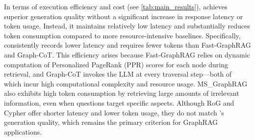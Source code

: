 In terms of execution efficiency and cost (see \autoref{tab:main_results}), \name{} achieves superior generation quality without a significant increase in response latency or token usage. Instead, it maintains relatively low latency and substantially reduces token consumption compared to more resource‐intensive baselines. Specifically, \name{} consistently records lower latency and requires fewer tokens than Fast-GraphRAG and Graph-CoT. This efficiency arises because Fast-GraphRAG relies on dynamic computation of Personalized PageRank (PPR) scores for each node during retrieval, and Graph-CoT invokes the LLM at every traversal step—both of which incur high computational complexity and resource usage. MS\_GraphRAG also exhibits high token consumption by retrieving large amounts of irrelevant information, even when questions target specific aspects. Although RoG and Cypher offer shorter latency and lower token usage, they do not match \name{}’s generation quality, which remains the primary criterion for GraphRAG applications.



\begin{table}[!t]
\centering
\caption{Win rates for each of the basic question patterns and nested questions.}
\label{tab:overall_decompose}
\end{table}


